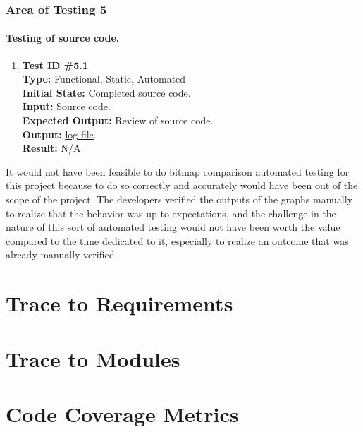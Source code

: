 \documentclass[12pt, titlepage]{article}
\begin{document}
\subsubsection{Area of Testing 5}		
	\paragraph{Testing of source code.}
		\begin{enumerate}
			\item{\textbf{Test ID \#5.1\\}}
			\textbf{Type:} Functional, Static, Automated\\
			\textbf{Initial State:} Completed source code. \\
			\textbf{Input:} Source code.\\
			\textbf{Expected Output:} Review of source code.\\
			\textbf{Output:}	 \href{run:code_eval.txt} {\underline{log-file}}.\\
			\textbf{Result:} N/A
		\end{enumerate}

It would not have been feasible to do bitmap comparison automated testing for this project because to do so correctly and accurately would have been out of the scope of the project. The developers verified the outputs of the graphs manually to realize that the behavior was up to expectations, and the challenge in the nature of this sort of automated testing would not have been worth the value compared to the time dedicated to it, especially to realize an outcome that was already manually verified.
		
\section{Trace to Requirements} %
		
\section{Trace to Modules} %
\section{Code Coverage Metrics} %


\end{document}
